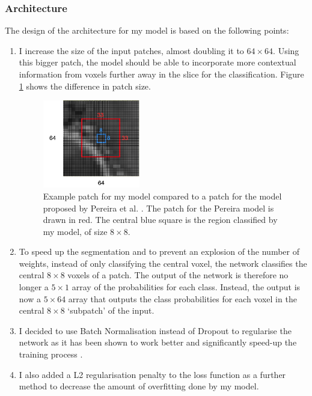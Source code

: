 \documentclass[12pt,a4paper,twoside,openright]{report}
\begin{document}
\subsubsection{Architecture}
The design of the architecture for my model is based on the following points:
\begin{enumerate}
	\item I increase the size of the input patches, almost doubling it to $64 \times 64$. Using this bigger patch, the model should be able to incorporate more contextual information from voxels further away in the slice for the classification. Figure \ref{fig:bigger_patches} shows the difference in patch size.
		\begin{figure}
			\centering
			\includegraphics[width=0.4\textwidth]{bigger_patches}
			\caption[Example patch for my model compared to a patch for the model proposed by Pereira et al.]{Example patch for my model compared to a patch for the model proposed by Pereira et al. \cite{pereira}. The patch for the Pereira model is drawn in red. The central blue square is the region classified by my model, of size $8 \times 8$.}
			\label{fig:bigger_patches}
		\end{figure}
	\item To speed up the segmentation and to prevent an explosion of the number of weights, instead of only classifying the central voxel, the network classifies the central $8 \times 8$ voxels of a patch. The output of the network is therefore no longer a $5 \times 1$ array of the probabilities for each class. Instead, the output is now a $5 \times 64$ array that outputs the class probabilities for each voxel in the central $8 \times 8$ `subpatch' of the input. 
	\item I decided to use Batch Normalisation instead of Dropout to regularise the network as it has been shown to work better and significantly speed-up the training process \cite{batch_normalization}. 
	\item I also added a L2 regularisation penalty to the loss function as a further method to decrease the amount of overfitting done by my model.

\end{enumerate}
\end{document}
